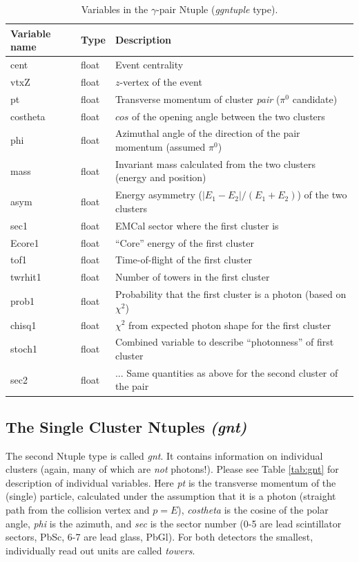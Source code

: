 \documentclass[pdftex,12pt,letter]{article}
\begin{document}
\begin{table}[h]
  \begin{tabular}{|l|l|l|} \hline
    Variable name & Type & Description \\ \hline
    cent & float & Event centrality \\
    vtxZ & float & $z$-vertex of the event \\
    pt   & float & Transverse momentum of cluster {\it pair} ($\pi^0$
    candidate) \\
    costheta & float & $cos$ of the opening angle between the two clusters \\    
    phi & float & Azimuthal angle of the direction of the pair momentum
    (assumed $\pi^0$) \\
    mass & float & Invariant mass calculated from the two clusters (energy and
    position) \\
    asym & float & Energy asymmetry ($|E_1-E_2|/(E_1+E_2)$) of the two clusters \\
    sec1 & float & EMCal sector where the first cluster is \\
    Ecore1 & float & ``Core'' energy of the first cluster \\
    tof1   & float & Time-of-flight of the first cluster \\
    twrhit1 & float & Number of towers in the first cluster \\
    prob1 & float & Probability that the first cluster is a photon (based on
    $\chi^2$) \\
    chisq1 & float & $\chi^2$ from expected photon shape for the first cluster
    \\
    stoch1 & float & Combined variable to describe ``photonness'' of first
    cluster \\
    sec2 & float & ...  Same quantities as above for the second cluster of the
    pair \\ \hline
  \end{tabular}
  \vspace{0.3cm}
  \caption{Variables in the $\gamma$-pair Ntuple ({\it ggntuple} type).
}
  \label{tab:ggntuple}
 \end{table}

\subsection{The Single Cluster Ntuples \it{(gnt)}}
The second Ntuple type is called {\it gnt}. It contains information on
individual clusters (again, many of which are {\it not} photons!).
Please see Table \ref{tab:gnt} for description of individual variables.
Here {\it pt} is the transverse momentum of the (single) particle,
calculated under the assumption that it is a photon (straight path
from the collision vertex and $p=E$), {\it costheta} is the cosine of
the polar angle, {\it phi} is the azimuth, and {\it sec} is the sector
number (0-5 are lead scintillator sectors, PbSc, 6-7 are lead glass,
PbGl).  For both detectors the smallest, individually read out units
are called {\it towers}.
\end{document}
